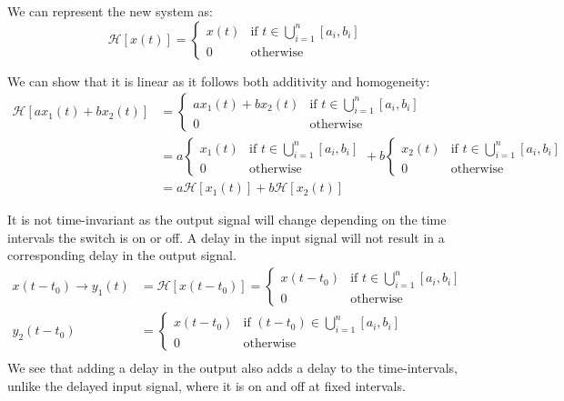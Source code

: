 \documentclass{article}
\begin{document}
\begin{enumerate}[label=5.\arabic*]
    We can represent the new system as:
    \[
        \mathcal{H}[x(t)] =\begin{cases}
        x(t) & \text{if } t \in \bigcup_{i=1}^{n} [a_i, b_i] \\
        0 & \text{otherwise}
        \end{cases}
    \]

    We can show that it is linear as it follows both additivity and homogeneity:
    \begin{align*}
        \mathcal{H}[ax_1(t) +bx_2(t)] &= \begin{cases}
            ax_1(t) + bx_2(t) & \text{if } t \in \bigcup_{i=1}^{n} [a_i, b_i] \\
            0 & \text{otherwise}
        \end{cases} \\
        &= a\begin{cases}
            x_1(t) & \text{if } t \in \bigcup_{i=1}^{n} [a_i, b_i] \\
            0 & \text{otherwise}
        \end{cases} + b\begin{cases}
            x_2(t) & \text{if } t \in \bigcup_{i=1}^{n} [a_i, b_i] \\
            0 & \text{otherwise}
        \end{cases} \\
        &= a\mathcal{H}[x_1(t)] + b\mathcal{H}[x_2(t)]
    \end{align*}

    It is not time-invariant as the output signal will change depending on the time intervals the switch is on or off. A delay in the input signal will not result in a corresponding delay in the output signal. 
    \begin{align*}
        x(t-t_0) \rightarrow y_1(t) &= \mathcal{H}[x(t-t_0)] = \begin{cases}
            x(t-t_0) & \text{if } t \in \bigcup_{i=1}^{n} [a_i, b_i] \\
            0 & \text{otherwise}
        \end{cases} \\
        y_2(t-t_0) &= \begin{cases}
            x(t-t_0) & \text{if } (t-t_0) \in \bigcup_{i=1}^{n} [a_i, b_i] \\
            0 & \text{otherwise}
        \end{cases} \\
    \end{align*}
    We see that adding a delay in the output also adds a delay to the time-intervals, unlike the delayed input signal, where it is on and off at fixed intervals. 
    

\end{enumerate}
\end{document}
